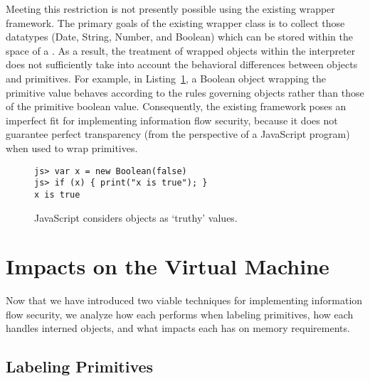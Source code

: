 Meeting this restriction is not presently possible using the existing wrapper framework.
The primary goals of the existing wrapper class is to collect those datatypes (Date, String, Number, and Boolean) which can be stored within the space of a .
As a result, the treatment of wrapped objects within the interpreter does not sufficiently take into account the behavioral differences between objects and primitives.
For example, in Listing~\ref{list:boolean}, a Boolean object wrapping the primitive value  behaves according to the rules governing objects rather than those of the primitive boolean value.
Consequently, the existing framework poses an imperfect fit for implementing information flow security, because it does not guarantee perfect transparency (from the perspective of a JavaScript program) when used to wrap primitives.

\begin{figure}[h]
\begin{lstlisting}
js> var x = new Boolean(false)
js> if (x) { print("x is true"); }
x is true
\end{lstlisting}
  \caption{JavaScript considers objects as `truthy' values.}
  \label{list:boolean}
\end{figure}

\section{Impacts on the Virtual Machine}
\label{sec:analysis}

Now that we have introduced two viable techniques for implementing information flow security, we analyze how each performs when labeling primitives, how each handles interned objects, and what impacts each has on memory requirements.

\subsection{Labeling Primitives}\label{sec:primitives}


